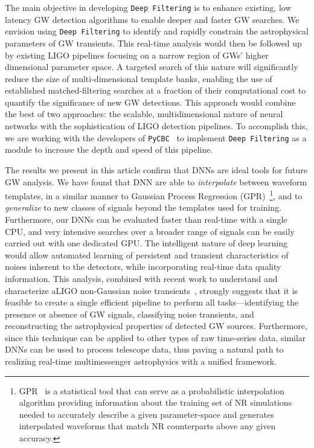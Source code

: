 \documentclass[aps,prd,%
amsmath,floats,floatfix, twocolumn, superscriptaddress,nofootinbib,showpacs]{revtex4-1}
\begin{document}
The main objective in developing \texttt{Deep Filtering} is to enhance existing, low latency GW detection algorithms to enable deeper and faster GW searches. We envision using \texttt{Deep Filtering} to identify and rapidly constrain the astrophysical parameters of GW transients. This real-time analysis would then be followed up by existing LIGO pipelines focusing on a narrow region of GWs' higher dimensional parameter space. A targeted search of this nature will significantly reduce the size of multi-dimensional template banks, enabling the use of established matched-filtering searches at a fraction of their computational cost to quantify the significance of new GW detections. This approach would combine the best of two approaches: the scalable, multidimensional nature of neural networks with the sophistication of LIGO detection pipelines. To accomplish this, we are working with the developers of \texttt{PyCBC}~\cite{2016CQGra..33u5004U} to implement \texttt{Deep Filtering} as a module to increase the depth and speed of this pipeline.

The results we present in this article confirm that DNNs are ideal tools for future GW analysis. We have found that DNN are able to \textit{interpolate} between waveform templates,  in a similar manner to Gaussian Process Regression (GPR)~\footnote{GPR~\cite{2003itil.book.....M,gpr:2016PhRvD,moore:2014gpr} is a statistical tool that can serve as a probabilistic interpolation algorithm providing information about the training set of NR simulations needed to accurately describe a given parameter-space and generates interpolated waveforms that match NR counterparts above any given accuracy.}, and to \textit{generalize} to new classes of signals beyond the templates used for training. Furthermore, our DNNs can be evaluated faster than real-time with a single CPU, and very intensive searches over a broader range of signals can be easily carried out with one dedicated GPU. The intelligent nature of deep learning would allow automated learning of persistent and transient characteristics of noises inherent to the detectors, while incorporating real-time data quality information. This analysis, combined with recent work to understand and characterize aLIGO non-Gaussian noise transients~\cite{spy:2016arXiv,Geo:2017b}, strongly suggests that it is feasible to create a single efficient pipeline to perform all tasks---identifying the presence or absence of GW signals, classifying noise transients, and reconstructing the astrophysical properties of detected GW sources. Furthermore, since this technique can be applied to other types of raw time-series data, similar DNNs can be used to process telescope data, thus paving a natural path to realizing real-time multimessenger astrophysics with a unified framework.
\end{document}

